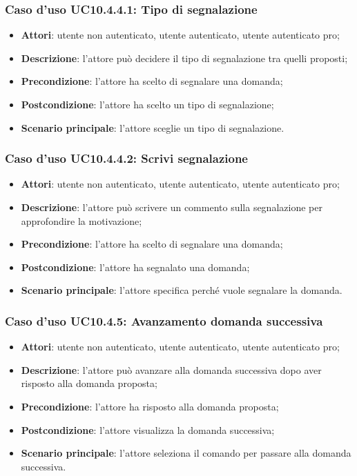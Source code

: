 \subsubsection{Caso d'uso UC10.4.4.1: Tipo di segnalazione}
	\begin{itemize}
		\item \textbf{Attori}: utente non autenticato, utente autenticato, utente autenticato pro;
		\item \textbf{Descrizione}: l'attore può decidere il tipo di segnalazione tra quelli proposti;
		\item \textbf{Precondizione}: l'attore ha scelto di segnalare una domanda;
		\item \textbf{Postcondizione}: l'attore ha scelto un tipo di segnalazione;
		\item \textbf{Scenario principale}: l'attore sceglie un tipo di segnalazione.
	\end{itemize}
\subsubsection{Caso d'uso UC10.4.4.2: Scrivi segnalazione}
	\begin{itemize}
		\item \textbf{Attori}: utente non autenticato, utente autenticato, utente autenticato pro;
		\item \textbf{Descrizione}: l'attore può scrivere un commento sulla segnalazione per approfondire la motivazione;
		\item \textbf{Precondizione}: l'attore ha scelto di segnalare una domanda;
		\item \textbf{Postcondizione}: l'attore ha segnalato una domanda;
		\item \textbf{Scenario principale}: l'attore specifica perché vuole segnalare la domanda.
	\end{itemize}
\subsubsection{Caso d'uso UC10.4.5: Avanzamento domanda successiva}
	\begin{itemize}
		\item \textbf{Attori}: utente non autenticato, utente autenticato, utente autenticato pro;
		\item \textbf{Descrizione}: l'attore può avanzare alla domanda successiva dopo aver risposto alla domanda proposta; 
		\item \textbf{Precondizione}: l'attore ha risposto alla domanda proposta;
		\item \textbf{Postcondizione}: l'attore visualizza la domanda successiva;
		\item \textbf{Scenario principale}: l'attore seleziona il comando per passare alla domanda successiva.
	\end{itemize}
